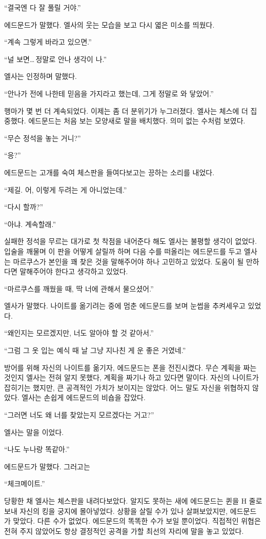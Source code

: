``결국엔 다 잘 풀릴 거야.''

에드문드가 말했다. 엘사의 웃는 모습을 보고 다시 엷은 미소를 띄웠다.

``계속 그렇게 바라고 있으면.''

``널 보면\ldots\,정말로 안나 생각이 나.''

엘사는 인정하며 말했다.

``안나가 전에 나한테 믿음을 가지라고 했는데, 그게 정말로 와 닿았어.''

행마가 몇 번 더 계속되었다. 이제는 좀 더 분위기가 누그러졌다. 엘사는 체스에 더 집중했다. 에드문드는 처음 보는 모양새로 말을 배치했다. 의미 없는 수처럼 보였다.

``무슨 정석을 놓는 거니?''

``응?''

에드문드는 고개를 숙여 체스판을 들여다보고는 끙하는 소리를 내었다.

``제길. 어, 이렇게 두려는 게 아니었는데.''

``다시 할까?''

``아냐. 계속할래.''

실패한 정석을 무르는 대가로 첫 착점을 내어준다 해도 엘사는 불평할 생각이 없었다. 입술을 깨물며 이 판을 어떻게 살릴까 하며 다음 수를 떠올리는 에드문드를 두고 엘사는 마르쿠스가 본인을 꽤 찾은 것을 말해주어야 하나 고민하고 있었다. 도움이 될 만하다면 말해주어야 한다고 생각하고 있었다.

``마르쿠스를 깨웠을 때, 딱 너에 관해서 물으셨어.''

엘사가 말했다. 나이트를 옮기려는 중에 멈춘 에드문드를 보며 눈썹을 추켜세우고 있었다.

``왜인지는 모르겠지만, 너도 알아야 할 것 같아서.''

``그럼 그 옷 입는 예식 때 날 그냥 지나친 게 운 좋은 거였네.''

방어를 위해 자신의 나이트를 옮기자, 에드문드는 폰을 전진시켰다. 무슨 계획을 짜는 것인지 엘사는 전혀 알지 못했다, 계획을 짜기나 하고 있다면 말이다. 자신의 나이트가 잡히기는 했지만, 큰 공격적인 가치가 보이지는 않았다. 어느 말도 자신을 위협하지 않았다. 엘사는 손쉽게 에드문드의 비숍을 잡았다.

``그러면 너도 왜 너를 찾았는지 모르겠다는 거고?''

엘사는 말을 이었다.

``나도 누나랑 똑같아.''

에드문드가 말했다. 그러고는

``체크메이트.''

당황한 채 엘사는 체스판을 내려다보았다. 알지도 못하는 새에 에드문드는 퀸을 H 줄로 보내 자신의 킹을 궁지에 몰아넣었다. 상황을 살릴 수가 있나 살펴보았지만, 에드문드가 맞았다. 다른 수가 없었다. 에드문드의 똑똑한 수가 보일 뿐이었다. 직접적인 위협은 전혀 주지 않았어도 항상 결정적인 공격을 가할 최선의 자리에 말을 놓고 있었다.

